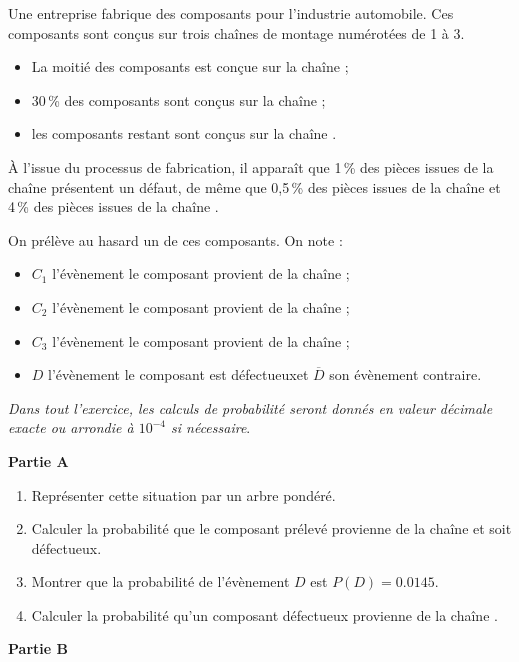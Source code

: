 Une entreprise fabrique des composants pour l'industrie automobile. Ces composants sont conçus sur trois chaînes de montage numérotées de 1 à 3.

\begin{itemize}
	\item La moitié des composants est conçue sur la chaîne  ;
	\item 30\,\% des composants sont conçus sur la chaîne ;
	\item les composants restant sont conçus sur la chaîne .
\end{itemize}

À l'issue du processus de fabrication, il apparaît que 1\,\% des pièces issues de la chaîne  présentent un défaut, de même que 0,5\,\% des pièces issues de la chaîne  et 4\,\% des pièces issues de la chaîne .

On prélève au hasard un de ces composants. On note :

\begin{itemize}
	\item $C_1$ l'évènement \og le composant provient de la chaîne  \fg{} ;
	\item $C_2$ l'évènement \og le composant provient de la chaîne  \fg{} ;
	\item $C_3$ l'évènement \og le composant provient de la chaîne  \fg{} ;
	\item $D$ l'évènement \og le composant est défectueux\fg et $\overline{D}$ son évènement contraire.
\end{itemize}

\emph{Dans tout l'exercice, les calculs de probabilité seront donnés en valeur décimale exacte ou arrondie à $10^{-4}$ si nécessaire}.

\medskip

\textbf{Partie A}

\begin{enumerate}
	\item Représenter cette situation par un arbre pondéré.
	\item Calculer la probabilité que le composant prélevé provienne de la chaîne  et soit défectueux.
	\item Montrer que la probabilité de l'évènement $D$ est $P(D) = \num{0,0145}$.
	\item Calculer la probabilité qu'un composant défectueux provienne de la chaîne .
\end{enumerate}

\textbf{Partie B}


